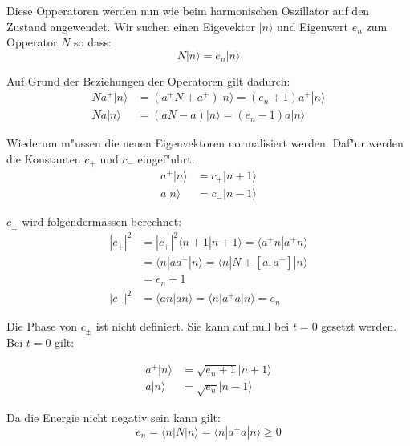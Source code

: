 Diese Opperatoren werden nun wie beim harmonischen Oszillator auf den Zustand angewendet. Wir suchen einen Eigevektor $|n\rangle$ und Eigenwert $e_n$ zum Opperator $N$ so dass:
\begin{equation}
N|n\rangle = e_n|n\rangle
\end{equation}

Auf Grund der Beziehungen der Operatoren gilt dadurch:
\begin{equation}
\begin{split}
Na^+|n\rangle &= (a^+N + a^+)|n\rangle = (e_n + 1)a^+|n\rangle \\
Na|n\rangle &= (aN - a)|n\rangle = (e_n - 1)a|n\rangle
\end{split}
\end{equation}

Wiederum m"ussen die neuen Eigenvektoren normalisiert werden. Daf"ur werden die Konstanten $c_+$ und $c_-$ eingef"uhrt.
\begin{equation}
\begin{split}
a^+|n\rangle &= c_+|n+1\rangle \\
a|n\rangle &= c_-|n-1\rangle
\end{split}
\end{equation}

$c_\pm$ wird folgendermassen berechnet:
\begin{equation}
\begin{split}
	|c_+|^2 &= |c_+|^2 \langle n+1 | n+1 \rangle = \langle a^+n | a^+n \rangle \\
		&= \langle n | aa^+ |n \rangle = \langle n | N + [a,a^+] |n \rangle \\
		&= e_n+1 \\
	|c_-|^2 &= 	\langle an | an \rangle = \langle n | a^+a | n \rangle = e_n
\end{split}
\end{equation}

Die Phase von $c_{\pm}$ ist nicht definiert. Sie kann auf null bei $t=0$ gesetzt werden. Bei $t=0$ gilt:

\begin{equation}
\begin{split}
a^+|n\rangle &= \sqrt{e_n+1}|n+1\rangle \\
a|n\rangle &= \sqrt{e_n}|n-1\rangle
\end{split}
\end{equation}

Da die Energie nicht negativ sein kann gilt:
\begin{equation}
e_n = \langle n | N |n \rangle = \langle n | a^+a |n \rangle \geq 0
\end{equation}


